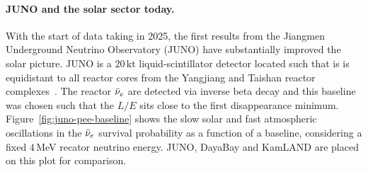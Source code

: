 \paragraph{JUNO and the solar sector today.}
\label{sec:landscape-juno}
With the start of data taking in 2025, the first results from the Jiangmen 
Underground Neutrino Observatory (JUNO) have substantially improved the 
solar picture. JUNO is a $20$\,kt liquid-scintillator detector located such that is is 
equidistant to all reactor cores from the Yangjiang and Taishan reactor complexes~\cite{JUNO2026}. 
The reactor $\bar\nu_e$ are detected via inverse beta decay and this baseline was chosen
such that the $L/E$ sits close to the first disappearance minimum.
Figure~\ref{fig:juno-pee-baseline} shows the slow solar and fast atmospheric oscillations in
the $\bar\nu_e$ survival probability as a function of a baseline, considering a fixed 
$4$\,MeV recator neutrino energy. JUNO, DayaBay and KamLAND are placed on this plot for 
comparison.

